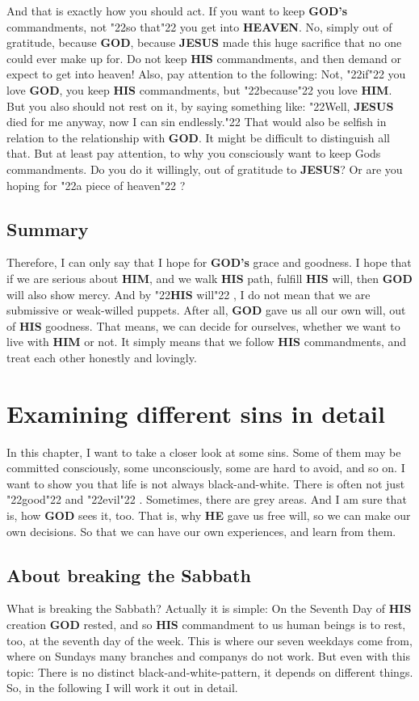 \documentclass[10pt,a5paper]{article}
\newcommand{\God}[0]{\textbf{GOD}}
\newcommand{\Gods}[0]{\textbf{GOD's}}
\newcommand{\He}[0]{\textbf{HE}}
\newcommand{\Heaven}[0]{\textbf{HEAVEN}}
\newcommand{\Him}[0]{\textbf{HIM}}
\newcommand{\His}[0]{\textbf{HIS}}
\newcommand{\Jesus}[0]{\textbf{JESUS}}
\newcommand{\q}[1]{\char"22{#1}\char"22 }
\begin{document}
		And that is exactly how you should act.
		If you want to keep {\Gods} commandments,
		not \q{so that} you get into {\Heaven}.
		No,
		simply out of gratitude,
		because {\God},
		because {\Jesus} made this huge sacrifice that no one could ever make up for.
		Do not keep {\His} commandments,
		and then demand or expect to get into heaven!
		Also,
		pay attention to the following:
		Not,
		\q{if} you love {\God},
		you keep {\His} commandments,
		but \q{because} you love {\Him}.
		But you also should not rest on it,
		by saying something like:
		\q{Well,
		{\Jesus} died for me anyway,
		now I can sin endlessly.}
		That would also be selfish in relation to the relationship with {\God}.
		It might be difficult to distinguish all that.
		But at least pay attention,
		to why you consciously want to keep {Gods} commandments.
		Do you do it willingly,
		out of gratitude to {\Jesus}?
		Or are you hoping for \q{a piece of heaven}?
		
	\subsection{Summary}
		Therefore,
		I can only say that I hope for {\Gods} grace and goodness.
		I hope that if we are serious about {\Him},
		and we walk {\His} path,
		fulfill {\His} will,
		then {\God} will also show mercy.
		And by \q{{\His} will},
		I do not mean that we are submissive or weak-willed puppets.
		After all,
		{\God} gave us all our own will,
		out of {\His} goodness.
		That means,
		we can decide for ourselves,
		whether we want to live with {\Him} or not.
		It simply means that we follow {\His} commandments,
		and treat each other honestly and lovingly.

	\newpage
	\section{Examining different sins in detail}
		In this chapter,
		I want to take a closer look at some sins.
		Some of them may be committed consciously,
		some unconsciously,
		some are hard to avoid,
		and so on.
		I want to show you that life is not always black-and-white.
		There is often not just \q{good} and \q{evil}.
		Sometimes,
		there are grey areas.
		And I am sure that is,
		how {\God} sees it,
		too.
		That is,
		why {\He} gave us free will,
		so we can make our own decisions.
		So that we can have our own experiences,
		and learn from them.

	\subsection{About breaking the Sabbath}
		What is breaking the Sabbath?
		Actually it is simple:
		On the Seventh Day of {\His} creation {\God} rested,
		and so {\His} commandment to us human beings is to rest,
		too,
		at the seventh day of the week.
		This is where our seven weekdays come from,
		where on Sundays many branches and companys do not work.
		But even with this topic:
		There is no distinct black-and-white-pattern,
		it depends on different things.
		So,
		in the following I will work it out in detail.
	
\end{document}
